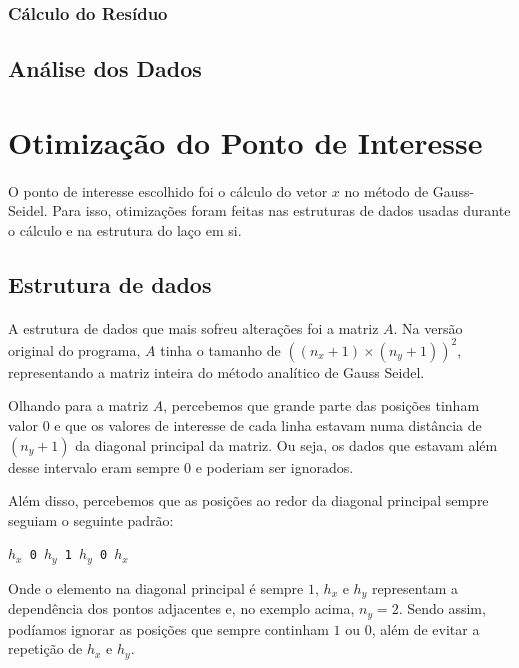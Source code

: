 \documentclass[12pt]{article}
\begin{document}
		\subsubsection{Cálculo do Resíduo}

	\subsection{Análise dos Dados}

\newpage

\section{Otimização do Ponto de Interesse}

\paragraph{}
O ponto de interesse escolhido foi o cálculo do vetor $x$ no método de Gauss-Seidel.
Para isso, otimizações foram feitas nas estruturas de dados usadas durante o cálculo e na estrutura do laço em si.

	\subsection{Estrutura de dados}
	\paragraph{}
	A estrutura de dados que mais sofreu alterações foi a matriz $A$.
	Na versão original do programa, $A$ tinha o tamanho de $((n_x+1)\times(n_y+1))^2$, representando a matriz inteira do método analítico de Gauss Seidel.
	
	Olhando para a matriz $A$, percebemos que grande parte das posições tinham valor $0$ e que os valores de interesse de cada linha estavam numa distância de $(n_y+1)$ da diagonal principal da matriz.
	Ou seja, os dados que estavam além desse intervalo eram sempre $0$ e poderiam ser ignorados.
	
	Além disso, percebemos que as posições ao redor da diagonal principal sempre seguiam o seguinte padrão:
	
	\begin{center}
		\texttt{$h_x$ 0 $h_y$ 1 $h_y$ 0 $h_x$}
	\end{center}
	
	Onde o elemento na diagonal principal é sempre $1$, $h_x$ e $h_y$ representam a dependência dos pontos adjacentes e, no exemplo acima, $n_y=2$.
	Sendo assim, podíamos ignorar as posições que sempre continham $1$ ou $0$, além de evitar a repetição de $h_x$ e $h_y$.
	
\end{document}
